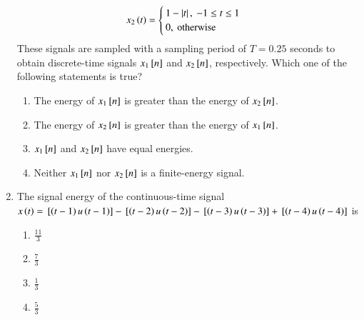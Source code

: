\documentclass[journal]{IEEEtran}
\begin{document}
\begin{enumerate}
\begin{align}
      x_2\left(t\right)=\begin{cases}
      1 - \left\vert t\right\vert, \ -1 \leq t \leq 1 \\ 0, \ \text{otherwise}
      \end{cases}
  \end{align}
  These signals are sampled with a sampling period of $T = 0.25$ seconds to obtain discrete-time signals $x_1{}\left[n\right]$ and $x_2{}\left[n\right]$, respectively.  Which one of the following statements is true?
  \begin{enumerate}
      \item The energy of $x_1{}\left[n\right]$ is greater than the energy of $x_2{}\left[n\right]$.
      \item The energy of $x_2{}\left[n\right]$ is greater than the energy of $x_1{}\left[n\right]$.
      \item $x_1{}\left[n\right]$ and $x_2{}\left[n\right]$ have equal energies.
      \item Neither $x_1{}\left[n\right]$ nor $x_2{}\left[n\right]$ is a finite-energy signal.
  \end{enumerate}
  \item The signal energy of the continuous-time signal $x\left(t\right)={}\left[\left(t-1\right)u\left(t-1\right)\right] - {}\left[\left(t-2\right)u\left(t-2\right)\right] - {}\left[\left(t-3\right)u\left(t-3\right)\right] + {}\left[\left(t-4\right)u\left(t-4\right)\right]$ is
  \begin{enumerate}
      \item $\frac{11}{3}$
      \item $\frac{7}{3}$
      \item $\frac{1}{3}$
      \item $\frac{5}{3}$
  \end{enumerate}
\end{enumerate} 

\end{document}
